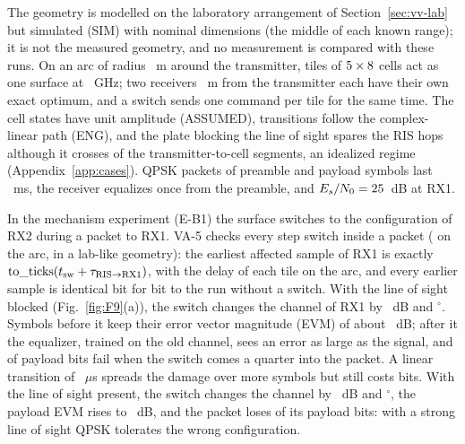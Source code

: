 The geometry is modelled on the laboratory arrangement of
Section~\ref{sec:vv-lab} but simulated (SIM) with nominal dimensions (the middle of each known
range); it is not the measured geometry, and no measurement is compared with these runs.
On an arc of radius \numEbArcRadiusM~m around the transmitter, \txtEbArcPanels{} tiles of
$5\times8$ cells act as one surface at \numEbFcGHz~GHz; two receivers
\numEbArcRxDistM~m from the transmitter each have their own exact optimum, and a switch sends
one command per tile for the same time. The cell states have unit amplitude (ASSUMED),
transitions follow the complex-linear path (ENG), and the plate blocking the line of sight
spares the RIS hops although it crosses \numEbArcBlockerCrossed{} of the
\numEbArcBlockerCells{} transmitter-to-cell segments, an idealized regime
(Appendix~\ref{app:cases}). QPSK packets of \numEbPreamble{} preamble and
\numEbPayload{} payload symbols last \numEbPacketMs~ms, the receiver equalizes once from the
preamble, and $E_s/N_0=25$~dB at RX1.

In the mechanism experiment (E-B1) the surface switches to the
configuration of RX2 during a packet to RX1. VA-5 checks every step switch inside a packet
(\numVaFiveArcTotal{} on the arc, \numVaFiveTotal{} in a lab-like geometry): the earliest
affected sample of RX1 is exactly $\mathrm{to\_ticks}(t_{\mathrm{sw}}+\tau_{\mathrm{RIS}\to\mathrm{RX1}})$,
with the delay of each tile on the arc, and every earlier sample is identical bit for bit to the
run without a switch. With the line of sight blocked (Fig.~\ref{fig:F9}(a)), the switch
changes the channel of RX1 by \numEbArcBlockedChangeDb~dB and
\numEbArcBlockedRotDeg$^\circ$. Symbols before it keep their error vector magnitude (EVM) of
about \numEbArcRefEvmDb~dB; after it the equalizer, trained on the old channel, sees an error
as large as the signal, and \numEbArcOneErrors{} of \numEbOneBits{} payload bits fail when the
switch comes a quarter into the packet. A linear transition of \numEbTransLongUs~$\mu$s spreads
the damage over more symbols but still costs \numEbArcLinErrors{} bits. With the line of sight
present, the switch changes the channel by \numEbArcLosChangeDb~dB and
\numEbArcLosRotDeg$^\circ$, the payload EVM rises to \numEbArcLosEvmDb~dB, and the packet loses
\numEbArcLosOneErrors{} of its \numEbOneBits{} payload bits: with a strong line of sight QPSK
tolerates the wrong configuration.

